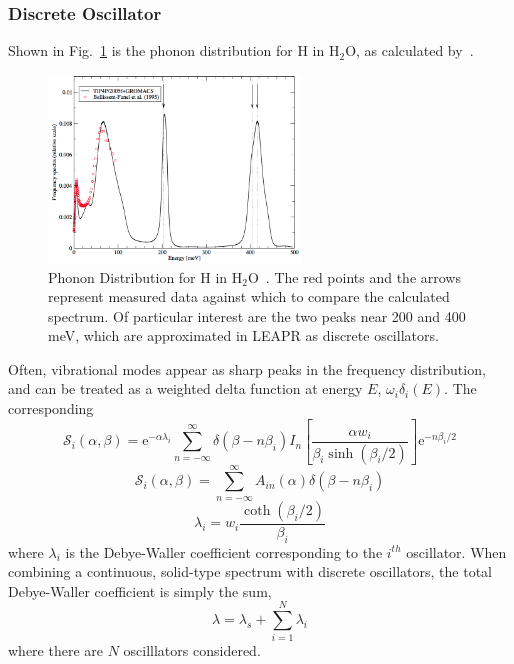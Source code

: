 \documentclass[../master.tex]{subfiles}
\begin{document}
			\subsubsection{Discrete Oscillator}
				Shown in Fig.~\ref{fig:phononDist} is the phonon distribution for H in H$_2$O, as calculated by~\cite{phononModel}.
				\begin{figure}[h]
				    \centering
				    \includegraphics[width=0.6\textwidth]{images/HinH2OphononDist75.png}
				    \caption[Phonon Distribution for H in H$_2$O]{Phonon Distribution for H in H$_2$O~\cite{phononModel}. The red points and the arrows represent measured data against which to compare the calculated spectrum. Of particular interest are the two peaks near 200 and 400 meV, which are approximated in LEAPR as discrete oscillators.}
				    \label{fig:phononDist}
				\end{figure}
                                Often, vibrational modes appear as sharp peaks in the frequency distribution, and can be treated as a weighted delta function at energy $E$, $\omega_i\delta_i(E)$. The corresponding 
				\begin{equation}
					\mathcal{S}_{i}(\alpha,\beta)=\mathrm{e}^{-\alpha\lambda_{i}}\sum_{n=-\infty}^{\infty}\delta\left(\beta-n\beta_{i}\right)I_{n}\left[\frac{\alpha w_{i}}{\beta_{i}\sinh\left(\beta_{i}/2\right)}\right]\mathrm{e}^{-n\beta_{i}/2}
				\end{equation}
				\begin{equation}
					\mathcal{S}_{i}(\alpha,\beta)=\sum_{n=-\infty}^{\infty}A_{in}(\alpha)\delta\left(\beta-n\beta_{i}\right)
				\end{equation}
                                \begin{equation}
                                        \lambda_{i}=w_{i}\frac{\operatorname{coth}\left(\beta_{i}/2\right)}{\beta_{i}}
                                \end{equation}
                                where $\lambda_i$ is the Debye-Waller coefficient corresponding to the $i^{th}$ oscillator. When combining a continuous, solid-type spectrum with discrete oscillators, the total Debye-Waller coefficient is simply the sum,
                                \begin{equation}
                                        \lambda=\lambda_{s}+\sum_{i=1}^{N}\lambda_{i}
                                \end{equation}
                                where there are $N$ oscilllators considered.
\end{document}
